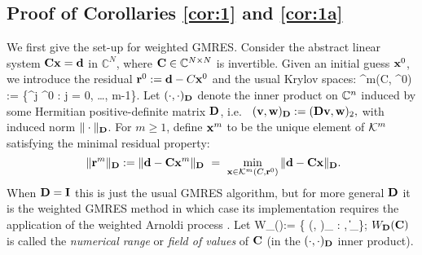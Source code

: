 %

\subsection{Proof of Corollaries \ref{cor:1} and \ref{cor:1a}}

We first give the set-up for weighted GMRES.
Consider the abstract  linear system 
$\mathbf{C} \mathbf{x} = \mathbf{d}$
in $\mathbb{C}^N$, where $\mathbf{C} \in \mathbb C^{N\times N}$ is invertible.   
Given an initial guess $\mathbf{x}^0$, we introduce the residual $\mathbf{r}^0 := \mathbf{d}- C \mathbf{x}^0$ and 
the usual Krylov spaces:  
\beqs  
\cK^m(C, \br^0) := \big\{\matrixC^j \br^0 : j = 0, \ldots, m-1\big\}.
\eeqs
Let $(\cdot , \cdot )_{\mathbf{D}}$ denote the inner product on $\mathbb C^n$ 
induced by some Hermitian positive-definite matrix $\mathbf{D}$, i.e.~
$(\mathbf{v},\mathbf{w})_{\mathbf{D}} := (\mathbf{D} \mathbf{v}, \mathbf{w})_2,$
with induced norm $\Vert \cdot \Vert_{\mathbf{D}}$. For $m \geq 1$, define   $\mathbf{x}^m$  to be  the unique element of $\mathcal K^m$ satisfying  the  
 minimal residual  property: 
$$ \ \Vert \mathbf{r}^m \Vert_{\mathbf{D}} := \Vert \mathbf{d} - \mathbf{C} \mathbf{x}^m \Vert_{\mathbf{D}} \ = \ \min_{\mathbf{x} \in \mathcal K^m(C, \mathbf{r}^0)} \Vert {\mathbf{d}} - {\mathbf{C}} {\mathbf{x}} \Vert_{\mathbf{D}}. $$
When $\mathbf{D} = \mathbf{I}$ this is just the usual GMRES algorithm, but for  more general  $\mathbf{D}$ it 
is the weighted GMRES method \cite{Es:98} in which case  
its implementation requires the application of the weighted Arnoldi process \cite{GuPe:14}.
Let 
\beq\label{eq:fov}
W_\Dmat(\matrixC):= \Big\{ (\matrixC \bx, \bx)_{\Dmat} : \bx \in \CCN, \|\bx\|_\Big\};
\eeq
$W_{\mathbf{D}}(\mathbf{C})$ is called the \emph{numerical range} or \emph{field of values} of $\mathbf{C}$ (in the $(\cdot,\cdot)_{\mathbf{D}}$ inner product).

